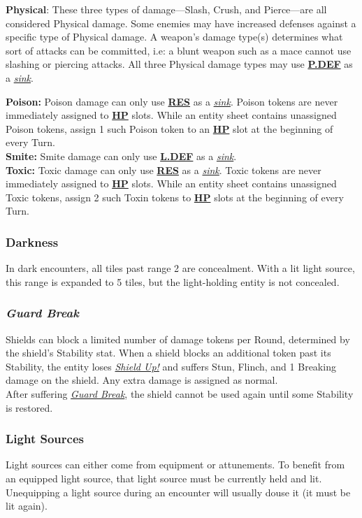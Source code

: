\documentclass[12pt]{article}
\newcommand{\refto}[1]{\hyperlink{#1}{\textbf{#1}}}
\newcommand{\reftoit}[1]{\hyperlink{#1}{\emph{#1}}}
\begin{document}
\begin{multicols*}{2}
\textbf{Physical}: These three types of damage—Slash, Crush, and Pierce—are all considered Physical damage. Some enemies may have increased defenses against a specific type of Physical damage. A weapon’s damage type(s) determines what sort of attacks can be committed, i.e: a blunt weapon such as a mace cannot use slashing or piercing attacks. All three Physical damage types may use \refto{P.DEF} as a \reftoit{sink}.

\textbf{Poison:} Poison damage can only use \refto{RES} as a \reftoit{sink}. Poison tokens are never immediately assigned to \refto{HP} slots. While an entity sheet contains unassigned Poison tokens, assign 1 such Poison token to an \refto{HP} slot at the beginning of every Turn.\\

\textbf{Smite:} Smite damage can only use \refto{L.DEF} as a \reftoit{sink}.\\

\textbf{Toxic:} Toxic damage can only use \refto{RES} as a \reftoit{sink}. Toxic tokens are never immediately assigned to \refto{HP} slots. While an entity sheet contains unassigned Toxic tokens, assign 2 such Toxin tokens to \refto{HP} slots at the beginning of every Turn.

\subsubsection{Darkness}
In dark encounters, all tiles past range 2 are concealment. With a lit light source, this range is expanded to 5 tiles, but the light-holding entity is not concealed.

\subsubsection{\emph{Guard Break}}
\hypertarget{Guard Break}{}
Shields can block a limited number of damage tokens per Round, determined by the shield’s Stability stat. When a shield blocks an additional token past its Stability, the entity loses \reftoit{Shield Up!} and suffers Stun, Flinch, and 1 Breaking damage on the shield. Any extra damage is assigned as normal.\\
After suffering \reftoit{Guard Break}, the shield cannot be used again until some Stability is restored.

\subsubsection{Light Sources}
Light sources can either come from equipment or attunements. To benefit from an equipped light source, that light source must be currently held and lit.\\
Unequipping a light source during an encounter will usually douse it (it must be lit again).


\end{multicols*}
\end{document}
